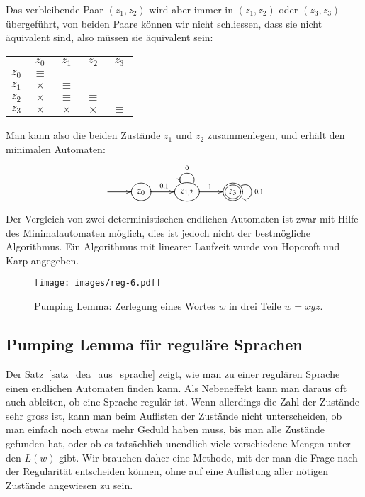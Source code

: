 Das verbleibende Paar $(z_1,z_2)$ wird aber immer in $(z_1,z_2)$ 
oder $(z_3,z_3)$ übergeführt, von beiden Paare können wir nicht
schliessen, dass sie nicht äquivalent sind, also müssen sie äquivalent
sein:
\begin{center}
\begin{tabular}{ccccc}
     &$z_0$   &$z_1$   &$z_2$   &$z_3$   \\
$z_0$&$\equiv$&        &        &        \\
$z_1$&$\times$&$\equiv$&        &        \\
$z_2$&$\times$&$\equiv$&$\equiv$&        \\
$z_3$&$\times$&$\times$&$\times$&$\equiv$
\end{tabular}
\end{center}
Man kann also die beiden Zustände $z_1$ und $z_2$ zusammenlegen,
und erhält den minimalen Automaten:
\[
\entrymodifiers={++[o][F]}
\xymatrix{
*+\txt{} \ar[r]
	&{z_0}\ar[r]^{0,1} 
		&{z_{1,2}}\ar@(ur,ul)_{0}\ar[r]^1
			&*++[o][F=]{z_3}\ar@(ur,dr)^{0,1}
}
\]

Der Vergleich von zwei deterministischen endlichen Automaten ist zwar
mit Hilfe des Minimalautomaten möglich, dies ist jedoch nicht der
bestmögliche Algorithmus.
Ein Algorithmus mit linearer Laufzeit wurde von Hopcroft und Karp
angegeben.
\begin{figure}
\begin{center}
\texttt{[image: images/reg-6.pdf]}
\end{center}
\caption{Pumping Lemma: Zerlegung eines Wortes $w$ in drei Teile
$w=xyz$.\label{regular:pumpinglemma-graph}}
\end{figure}

\subsection{Pumping Lemma für reguläre Sprachen\label{regulaer:pumpinglemma}}
Der Satz~\ref{satz_dea_aus_sprache} zeigt, wie man zu einer regulären Sprache
einen endlichen Automaten finden kann.
Als Nebeneffekt kann man daraus oft auch ableiten, ob eine Sprache regulär
ist.
Wenn allerdings die Zahl der Zustände sehr gross ist, kann man beim
Auflisten der Zustände nicht unterscheiden, ob man einfach noch etwas
mehr Geduld haben muss, bis man alle Zustände gefunden hat, oder ob
es tatsächlich unendlich viele verschiedene Mengen unter den $L(w)$
gibt.
Wir brauchen daher eine Methode, mit der man die Frage nach der
Regularität entscheiden können, ohne auf eine Auflistung aller
nötigen Zustände angewiesen zu sein.

